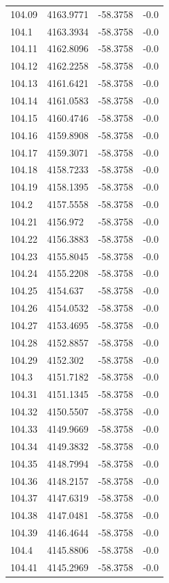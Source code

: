 \begin{table}[H]
\begin{tabular}{llll}
104.09 & 4163.9771 & -58.3758 & -0.0 \\
104.1 & 4163.3934 & -58.3758 & -0.0 \\
104.11 & 4162.8096 & -58.3758 & -0.0 \\
104.12 & 4162.2258 & -58.3758 & -0.0 \\
104.13 & 4161.6421 & -58.3758 & -0.0 \\
104.14 & 4161.0583 & -58.3758 & -0.0 \\
104.15 & 4160.4746 & -58.3758 & -0.0 \\
104.16 & 4159.8908 & -58.3758 & -0.0 \\
104.17 & 4159.3071 & -58.3758 & -0.0 \\
104.18 & 4158.7233 & -58.3758 & -0.0 \\
104.19 & 4158.1395 & -58.3758 & -0.0 \\
104.2 & 4157.5558 & -58.3758 & -0.0 \\
104.21 & 4156.972 & -58.3758 & -0.0 \\
104.22 & 4156.3883 & -58.3758 & -0.0 \\
104.23 & 4155.8045 & -58.3758 & -0.0 \\
104.24 & 4155.2208 & -58.3758 & -0.0 \\
104.25 & 4154.637 & -58.3758 & -0.0 \\
104.26 & 4154.0532 & -58.3758 & -0.0 \\
104.27 & 4153.4695 & -58.3758 & -0.0 \\
104.28 & 4152.8857 & -58.3758 & -0.0 \\
104.29 & 4152.302 & -58.3758 & -0.0 \\
104.3 & 4151.7182 & -58.3758 & -0.0 \\
104.31 & 4151.1345 & -58.3758 & -0.0 \\
104.32 & 4150.5507 & -58.3758 & -0.0 \\
104.33 & 4149.9669 & -58.3758 & -0.0 \\
104.34 & 4149.3832 & -58.3758 & -0.0 \\
104.35 & 4148.7994 & -58.3758 & -0.0 \\
104.36 & 4148.2157 & -58.3758 & -0.0 \\
104.37 & 4147.6319 & -58.3758 & -0.0 \\
104.38 & 4147.0481 & -58.3758 & -0.0 \\
104.39 & 4146.4644 & -58.3758 & -0.0 \\
104.4 & 4145.8806 & -58.3758 & -0.0 \\
104.41 & 4145.2969 & -58.3758 & -0.0 \\

\end{tabular}
\end{table}

